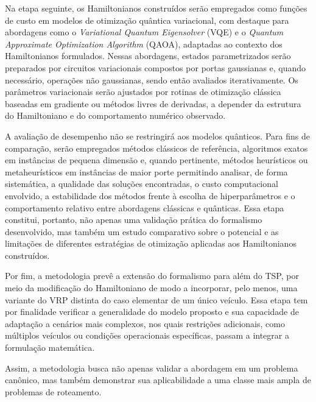 Na etapa seguinte, os Hamiltonianos construídos serão empregados como funções de custo em modelos de otimização quântica variacional, com destaque para abordagens como o \textit{Variational Quantum Eigensolver} (VQE) e o \textit{Quantum Approximate Optimization Algorithm} (QAOA), adaptadas ao contexto dos Hamiltonianos formulados. Nessas abordagens, estados parametrizados serão preparados por circuitos variacionais compostos por portas gaussianas e, quando necessário, operações não gaussianas, sendo então avaliados iterativamente. Os parâmetros variacionais serão ajustados por rotinas de otimização clássica baseadas em gradiente ou métodos livres de derivadas, a depender da estrutura do Hamiltoniano e do comportamento numérico observado.

A avaliação de desempenho não se restringirá aos modelos quânticos. Para fins de comparação, serão empregados métodos clássicos de referência, algoritmos exatos em instâncias de pequena dimensão e, quando pertinente, métodos heurísticos ou metaheurísticos em instâncias de maior porte permitindo analisar, de forma sistemática, a qualidade das soluções encontradas, o custo computacional envolvido, a estabilidade dos métodos frente à escolha de hiperparâmetros e o comportamento relativo entre abordagens clássicas e quânticas. Essa etapa constitui, portanto, não apenas uma validação prática do formalismo desenvolvido, mas também um estudo comparativo sobre o potencial e as limitações de diferentes estratégias de otimização aplicadas aos Hamiltonianos construídos.

Por fim, a metodologia prevê a extensão do formalismo para além do TSP, por meio da modificação do Hamiltoniano de modo a incorporar, pelo menos, uma variante do VRP distinta do caso elementar de um único veículo. Essa etapa tem por finalidade verificar a generalidade do modelo proposto e sua capacidade de adaptação a cenários mais complexos, nos quais restrições adicionais, como múltiplos veículos ou condições operacionais específicas, passam a integrar a formulação matemática. 

Assim, a metodologia busca não apenas validar a abordagem em um problema canônico, mas também demonstrar sua aplicabilidade a uma classe mais ampla de problemas de roteamento.

